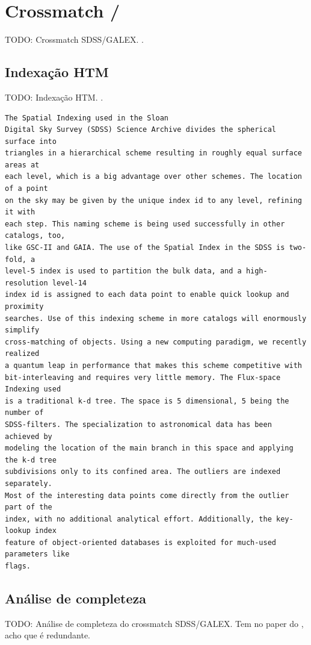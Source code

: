 \section{Crossmatch \SDSS/\galex}
TODO: Crossmatch SDSS/GALEX. \citet{Budavari2009}.

\subsection{Indexação HTM}
TODO: Indexação HTM. \citet{Kunszt2000}.
\begin{verbatim}
The Spatial Indexing used in the Sloan
Digital Sky Survey (SDSS) Science Archive divides the spherical surface into
triangles in a hierarchical scheme resulting in roughly equal surface areas at
each level, which is a big advantage over other schemes. The location of a point
on the sky may be given by the unique index id to any level, refining it with
each step. This naming scheme is being used successfully in other catalogs, too,
like GSC-II and GAIA. The use of the Spatial Index in the SDSS is two-fold, a
level-5 index is used to partition the bulk data, and a high-resolution level-14
index id is assigned to each data point to enable quick lookup and proximity
searches. Use of this indexing scheme in more catalogs will enormously simplify
cross-matching of objects. Using a new computing paradigm, we recently realized
a quantum leap in performance that makes this scheme competitive with
bit-interleaving and requires very little memory. The Flux-space Indexing used
is a traditional k-d tree. The space is 5 dimensional, 5 being the number of
SDSS-filters. The specialization to astronomical data has been achieved by
modeling the location of the main branch in this space and applying the k-d tree
subdivisions only to its confined area. The outliers are indexed separately.
Most of the interesting data points come directly from the outlier part of the
index, with no additional analytical effort. Additionally, the key-lookup index
feature of object-oriented databases is exploited for much-used parameters like
flags.
\end{verbatim}

\subsection{Análise de completeza}
TODO: Análise de completeza do crossmatch SDSS/GALEX. Tem no paper do
\citet{Budavari2009}, acho que é redundante.


